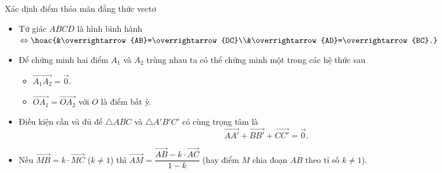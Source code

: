 \begin{dang}{Xác định điểm thỏa mãn đẳng thức vectơ}
\begin{note}
\begin{itemize}
\begin{itemize}
\begin{itemize}
					\item Với $O$ là điểm bất kì trong mặt phẳng thì: $3\overrightarrow{OG}=\overrightarrow{OA}+\overrightarrow{OB}+\overrightarrow{OC}$.
				\end{itemize}
				\item Tứ giác $ABCD$ là hình bình hành $\Leftrightarrow\hoac{&\overrightarrow{AB}=\overrightarrow{DC}\\&\overrightarrow{AD}=\overrightarrow{BC}.}$
				\item Để chứng minh hai điểm $A_1$ và $A_2$ trùng nhau ta có thể chứng minh một trong các hệ thức sau
				\begin{itemize}
					\item $\overrightarrow{A_1A_2}=\overrightarrow{0}$.
					\item $\overrightarrow{OA_1}=\overrightarrow{OA_2}$ với $O$ là điểm bất ỳ.
				\end{itemize}
				\item Điều kiện cần và đủ để $\triangle ABC$ và $\triangle A'B'C'$ có cùng trọng tâm là $$\overrightarrow{AA'}+\overrightarrow{BB'}+\overrightarrow{CC'}=\overrightarrow{0}.$$
				\item Nếu $\overrightarrow{MB}=k\cdot\overrightarrow{MC}$ ($k\ne 1$) thì $\overrightarrow{AM}=\dfrac{\overrightarrow{AB}-k\cdot\overrightarrow{AC}}{1-k}$ (hay điểm $M$ chia đoạn $AB$ theo tỉ số $k\ne 1$).
			\end{itemize}
		\end{itemize}
	\end{note}
\end{dang}
